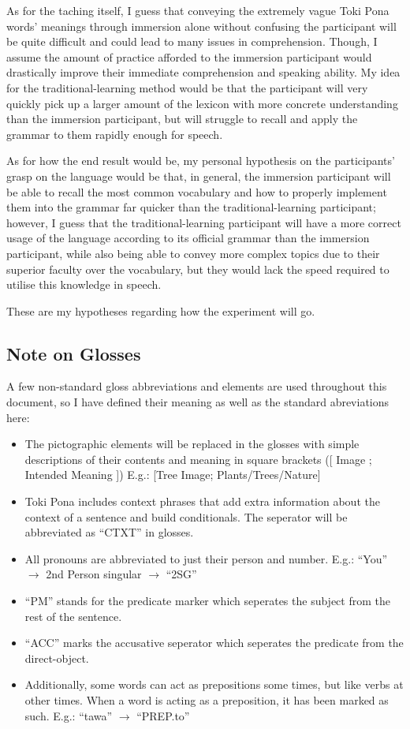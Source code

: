 \documentclass[a4paper,10pt]{article}
\begin{document}
As for the taching itself, I guess that conveying the extremely vague Toki Pona words' meanings
through immersion alone without confusing the participant will be quite difficult and could lead to
many issues in comprehension. Though, I assume the amount of practice afforded to the immersion
participant would drastically improve their immediate comprehension and speaking ability. My idea
for the traditional-learning method would be that the participant will very quickly pick up a
larger amount of the lexicon with more concrete understanding than the immersion participant, but
will struggle to recall and apply the grammar to them rapidly enough for speech.

As for how the end result would be, my personal hypothesis on the participants' grasp on the language
would be that, in general, the immersion participant will be able to recall the most common vocabulary
and how to properly implement them into the grammar far quicker than the traditional-learning
participant; however, I guess that the traditional-learning participant will have a more correct
usage of the language according to its official grammar than the immersion participant, while also
being able to convey more complex topics due to their superior faculty over the vocabulary, but they
would lack the speed required to utilise this knowledge in speech.

These are my hypotheses regarding how the experiment will go.

\subsection{Note on Glosses}
A few non-standard gloss abbreviations and elements are used
throughout this document, so I have defined their meaning as well as the
standard abreviations here:
\begin{itemize}
 \item The pictographic
 elements will be replaced in the glosses with simple descriptions of their
 contents and meaning in square brackets ([ Image ; Intended Meaning ])
 E.g.: [Tree Image; Plants/Trees/Nature]
 \item Toki Pona includes context phrases that add extra information
 about the context of a sentence and build conditionals. The seperator
 will be abbreviated as ``CTXT'' in glosses.
 \item All pronouns are abbreviated to just their person and number.
 E.g.: ``You'' $\rightarrow$ 2nd Person singular $\rightarrow$ ``2SG''
 \item ``PM'' stands for the predicate marker which seperates the subject
 from the rest of the sentence.
 \item ``ACC'' marks the accusative seperator which seperates the predicate
 from the direct-object.
 \item Additionally, some words can act as prepositions some times, but like
 verbs at other times. When a word is acting as a preposition, it has been
 marked as such. E.g.: ``tawa'' $\rightarrow$ ``PREP.to''
\end{itemize}
\end{document}
